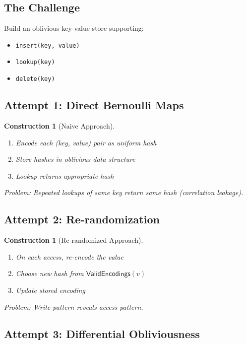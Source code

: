 \documentclass[11pt,final,hidelinks]{article}
\newcommand{\ValidEnc}{\mathsf{ValidEncodings}}
\newtheorem{construction}[theorem]{Construction}
\begin{document}
\subsection{The Challenge}

Build an oblivious key-value store supporting:
\begin{itemize}
    \item \texttt{insert(key, value)}
    \item \texttt{lookup(key)}
    \item \texttt{delete(key)}
\end{itemize}

\subsection{Attempt 1: Direct Bernoulli Maps}

\begin{construction}[Naive Approach]
\begin{enumerate}
    \item Encode each (key, value) pair as uniform hash
    \item Store hashes in oblivious data structure
    \item Lookup returns appropriate hash
\end{enumerate}
Problem: Repeated lookups of same key return same hash (correlation leakage).
\end{construction}

\subsection{Attempt 2: Re-randomization}

\begin{construction}[Re-randomized Approach]
\begin{enumerate}
    \item On each access, re-encode the value
    \item Choose new hash from $\ValidEnc(v)$
    \item Update stored encoding
\end{enumerate}
Problem: Write pattern reveals access pattern.
\end{construction}

\subsection{Attempt 3: Differential Obliviousness}
\end{document}
